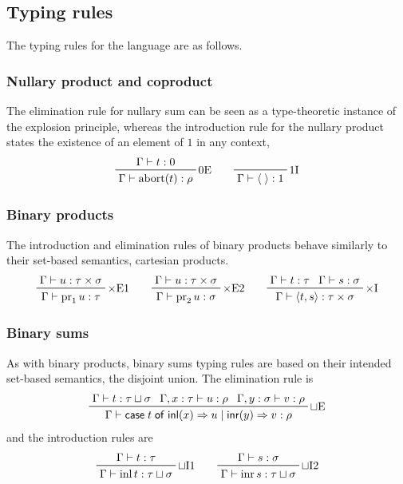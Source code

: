 \documentclass[11pt,a4paper]{article}
\theoremstyle{definition}
\theoremstyle{remark}
\providecommand{\casest}[5]{\mathsf{case}\;#1\;\mathsf{of}\;\mathsf{inl}(#2)\Rightarrow #3\;|\;\mathsf{inr}(#4)\Rightarrow #5}
\begin{document}
\subsection{Typing rules}
\label{sec:appendix-source-language-typing-rules}

The typing rules for the language are as follows.

\subsubsection{Nullary product and coproduct}

The elimination rule for nullary sum can be seen as a type-theoretic instance of the explosion principle, whereas the introduction rule for the nullary product states the existence of an element of \(1\) in any context,
\begin{equation*}
  \prftree[r]{\( 0 \text{E} \)}{\Gamma \vdash t : 0}{\Gamma \vdash \fn[n]{ \opn[b]{abort} }{ t } : \rho}
  \qquad
  \prftree[r]{\( 1 \text{I} \)}{\;}{\Gamma \vdash \tuple{\;} : 1}
\end{equation*}

\subsubsection{Binary products}

The introduction and elimination rules of binary products behave similarly to their set-based semantics, cartesian products.
\begin{equation*}
  \prftree[r]{\( \times \text{E1} \)}{
    \Gamma \vdash u: \tau \times \sigma
  }{
    \Gamma \vdash \opn[b]{pr}_{1} u : \tau
  }
  \qquad
  \prftree[r]{\( \times \text{E2} \)}{
    \Gamma \vdash u: \tau \times \sigma
  }{
    \Gamma \vdash \opn[b]{pr}_{2} u : \sigma
  }
  \qquad
  \prftree[r]{\( \times \text{I} \)}{\Gamma \vdash t: \tau}{\Gamma \vdash s: \sigma}{
    \Gamma \vdash \tuple{t, s} : \tau \times \sigma
  }
\end{equation*}

\subsubsection{Binary sums}

As with binary products, binary sums typing rules are based on their intended set-based semantics, the disjoint union. The elimination rule is
\begin{equation*}
  \prftree[r]{\( \sqcup \text{E} \)}{
    \Gamma \vdash t: \tau \sqcup \sigma
  }{
    \Gamma, x: \tau \vdash u : \rho
  }{
    \Gamma, y: \sigma \vdash v : \rho
  }{
    \Gamma \vdash
    \casest{t}{x}{u}{y}{v}: \rho
  }
\end{equation*}
and the introduction rules are
\begin{equation*}
  \prftree[r]{\( \sqcup \text{I1} \)}{
    \Gamma \vdash t: \tau
  }{
    \Gamma \vdash \opn[b]{inl} t : \tau \sqcup \sigma
  }
  \qquad
  \prftree[r]{\( \sqcup \text{I2} \)}{
    \Gamma \vdash s: \sigma
  }{
    \Gamma \vdash \opn[b]{inr} s : \tau \sqcup \sigma
  }
\end{equation*}
\end{document}
